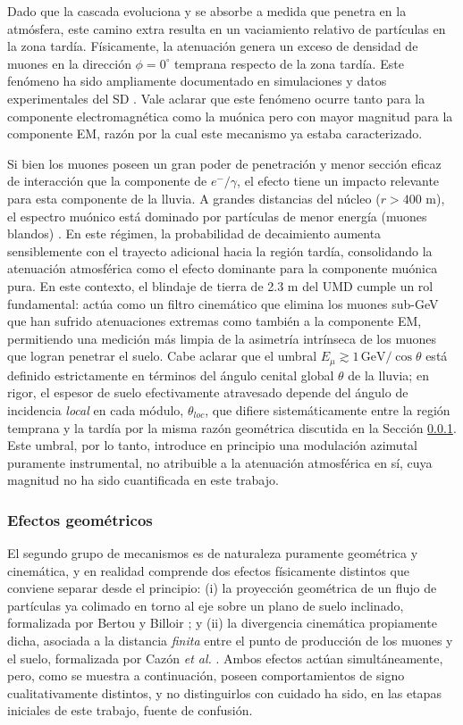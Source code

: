 Dado que la cascada evoluciona y se absorbe a medida que penetra en la atmósfera, este camino extra resulta en un vaciamiento relativo de partículas en la zona tardía. Físicamente, la atenuación genera un exceso de densidad de muones en la dirección $\phi = 0^\circ$ temprana respecto de la zona tardía. Este fenómeno ha sido ampliamente documentado en simulaciones y datos experimentales del SD \cite{Pryke1998, BradfieldThesis}. Vale aclarar que este fenómeno ocurre tanto para la componente electromagnética como la muónica pero con mayor magnitud para la componente EM, razón por la cual este mecanismo ya estaba caracterizado.

Si bien los muones poseen un gran poder de penetración y menor sección eficaz de interacción que la componente de $e^{-}/\gamma$, el efecto tiene un impacto relevante para esta componente de la lluvia. A grandes distancias del núcleo ($r > 400 \text{ m}$), el espectro muónico está dominado por partículas de menor energía (muones blandos) \cite{Cazon2012}. En este régimen, la probabilidad de decaimiento aumenta sensiblemente con el trayecto adicional hacia la región tardía, consolidando la atenuación atmosférica como el efecto dominante para la componente muónica pura. En este contexto, el blindaje de tierra de 2.3 m del UMD cumple un rol fundamental: actúa como un filtro cinemático que elimina los muones sub-GeV que han sufrido atenuaciones extremas como también a la componente EM, permitiendo una medición más limpia de la asimetría intrínseca de los muones que logran penetrar el suelo. Cabe aclarar que el umbral $E_\mu \gtrsim 1\,\mathrm{GeV}/\cos\theta$ está definido estrictamente en términos del ángulo cenital global $\theta$ de la lluvia; en rigor, el espesor de suelo efectivamente atravesado depende del ángulo de incidencia \textit{local} en cada módulo, $\theta_{loc}$, que difiere sistemáticamente entre la región temprana y la tardía por la misma razón geométrica discutida en la Sección \ref{subsubsec:divergencia}. Este umbral, por lo tanto, introduce en principio una modulación azimutal puramente instrumental, no atribuible a la atenuación atmosférica en sí, cuya magnitud no ha sido cuantificada en este trabajo.

\subsubsection{Efectos geométricos}
\label{subsubsec:divergencia}

El segundo grupo de mecanismos es de naturaleza puramente geométrica y cinemática, y en realidad comprende dos efectos físicamente distintos que conviene separar desde el principio: (i) la proyección geométrica de un flujo de partículas ya colimado en torno al eje sobre un plano de suelo inclinado, formalizada por Bertou y Billoir \cite{GAP2000_017}; y (ii) la divergencia cinemática propiamente dicha, asociada a la distancia \textit{finita} entre el punto de producción de los muones y el suelo, formalizada por Cazón \textit{et al.} \cite{Cazon2012}. Ambos efectos actúan simultáneamente, pero, como se muestra a continuación, poseen comportamientos de signo cualitativamente distintos, y no distinguirlos con cuidado ha sido, en las etapas iniciales de este trabajo, fuente de confusión.

